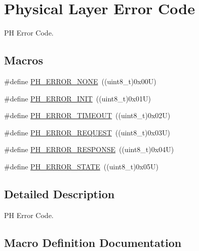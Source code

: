 \hypertarget{group___p_h___error___code}{}\section{Physical Layer Error Code}
\label{group___p_h___error___code}


PH Error Code.  


\subsection*{Macros}
\begin{DoxyCompactItemize}
\item 
\#define \hyperlink{group___p_h___error___code_ga67055c114ec03135c28e1cb6a3d68f5a}{P\+H\+\_\+\+E\+R\+R\+O\+R\+\_\+\+N\+O\+NE}~((uint8\+\_\+t)0x00\+U)
\item 
\#define \hyperlink{group___p_h___error___code_ga15fbdf4edfc98283ef0f1b7c2fc0a47b}{P\+H\+\_\+\+E\+R\+R\+O\+R\+\_\+\+I\+N\+IT}~((uint8\+\_\+t)0x01\+U)
\item 
\#define \hyperlink{group___p_h___error___code_gaae8d2172a18fdde6957c77af378c2574}{P\+H\+\_\+\+E\+R\+R\+O\+R\+\_\+\+T\+I\+M\+E\+O\+UT}~((uint8\+\_\+t)0x02\+U)
\item 
\#define \hyperlink{group___p_h___error___code_ga76393e5665e76130e95c73aab378c53d}{P\+H\+\_\+\+E\+R\+R\+O\+R\+\_\+\+R\+E\+Q\+U\+E\+ST}~((uint8\+\_\+t)0x03\+U)
\item 
\#define \hyperlink{group___p_h___error___code_ga104872de885107db19b579c81a62f563}{P\+H\+\_\+\+E\+R\+R\+O\+R\+\_\+\+R\+E\+S\+P\+O\+N\+SE}~((uint8\+\_\+t)0x04\+U)
\item 
\#define \hyperlink{group___p_h___error___code_ga495ce5ac265432fc88f35462ea1515f8}{P\+H\+\_\+\+E\+R\+R\+O\+R\+\_\+\+S\+T\+A\+TE}~((uint8\+\_\+t)0x05\+U)
\end{DoxyCompactItemize}


\subsection{Detailed Description}
PH Error Code. 



\subsection{Macro Definition Documentation}
